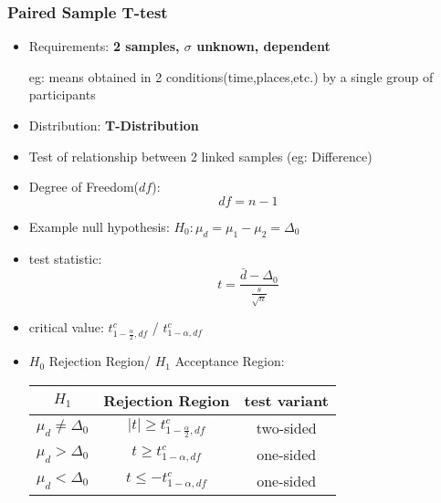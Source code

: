 \subsubsection{Paired Sample T-test}
\begin{itemize}
	\item Requirements: \textbf{2 samples, $\sigma$ unknown, dependent}
	
	eg: means obtained in 2 conditions(time,places,etc.) by a single group of participants
	\item Distribution: \textbf{T-Distribution}
	\item Test of relationship between 2 linked samples (eg: Difference)
	\item Degree of Freedom($df$): $$df = n -1 $$
	\item Example null hypothesis: $ H_0: \mu_d = \mu_1 - \mu_2 = \Delta_0$
	\item test statistic: 
	\large{$$t = \frac{\bar{d} - \Delta_0}{\frac{s}{\sqrt{n}}}$$}
	\item critical value: $t^c_{1-\frac{\alpha}{2}, df}$ / $t^c_{1-\alpha, df}$
	\item $H_0$ Rejection Region/ $H_1$ Acceptance Region:
	\begin{table}[H]
		\begin{center}
			\begin{tabular}{|c|c|c|}
				\hline
				$H_1$ 				& Rejection Region					& test variant \\ \hline
				$\mu_d \neq \Delta_0$	& $|t| \geq t^c_{1-\frac{\alpha}{2}, df}$	& two-sided                 \\ \hline
				$\mu_d > \Delta_0$	& $ t \geq t^c_{1-\alpha, df}$			& one-sided                  \\ \hline
				$\mu_d < \Delta_0$	& $ t \leq -t^c_{1-\alpha,df} $			& one-sided                  \\ \hline
			\end{tabular}
		\end{center}
	\end{table} 	
\end{itemize}

